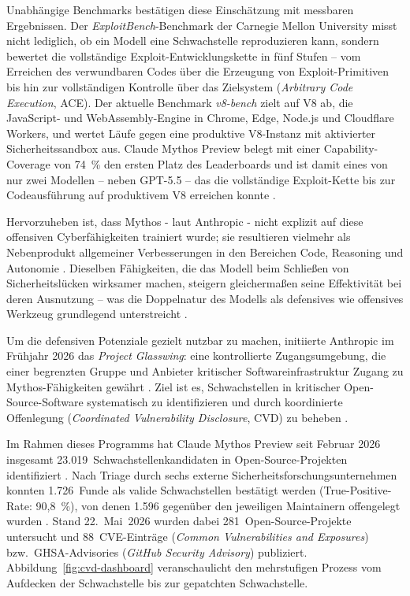 Unabhängige Benchmarks bestätigen diese Einschätzung mit messbaren
Ergebnissen. Der \emph{ExploitBench}-Benchmark der Carnegie Mellon
University misst nicht lediglich, ob ein Modell eine Schwachstelle
reproduzieren kann, sondern bewertet die vollständige
Exploit-Entwicklungskette in fünf Stufen -- vom Erreichen des
verwundbaren Codes über die Erzeugung von Exploit-Primitiven bis hin
zur vollständigen Kontrolle über das Zielsystem (\emph{Arbitrary Code Execution}, ACE). Der aktuelle Benchmark \emph{v8-bench} zielt auf
V8 ab, die JavaScript- und WebAssembly-Engine in Chrome, Edge,
Node.js und Cloudflare Workers, und wertet Läufe gegen eine
produktive V8-Instanz mit aktivierter Sicherheitssandbox aus.
Claude Mythos Preview belegt mit einer Capability-Coverage von
74~\% den ersten Platz des Leaderboards und ist damit eines von nur
zwei Modellen -- neben GPT-5.5 -- das die vollständige Exploit-Kette
bis zur Codeausführung auf produktivem V8 erreichen konnte \cite{exploitbench2026}.

Hervorzuheben ist, dass Mythos - laut Anthropic - nicht explizit auf diese offensiven
Cyberfähigkeiten trainiert wurde; sie resultieren vielmehr als Nebenprodukt allgemeiner Verbesserungen in den Bereichen Code, Reasoning
und Autonomie \cite{anthropic_mythos_preview}. Dieselben Fähigkeiten, die das
Modell beim Schließen von Sicherheitslücken wirksamer machen, steigern
gleichermaßen seine Effektivität bei deren Ausnutzung -- was die Doppelnatur des Modells als defensives wie offensives Werkzeug
grundlegend unterstreicht \cite{anthropic_glasswing}.

Um die defensiven Potenziale gezielt nutzbar zu machen, initiierte
Anthropic im Frühjahr 2026 das \emph{Project Glasswing}: eine kontrollierte
Zugangsumgebung, die einer begrenzten Gruppe und Anbieter kritischer Softwareinfrastruktur Zugang zu Mythos-Fähigkeiten
gewährt \cite{anthropic_glasswing}. Ziel ist es, Schwachstellen in
kritischer Open-Source-Software systematisch zu identifizieren und durch
koordinierte Offenlegung (\emph{Coordinated Vulnerability Disclosure},
CVD) zu beheben \cite{anthropic_cvd}.

Im Rahmen dieses Programms hat Claude Mythos Preview seit Februar 2026
insgesamt 23.019~Schwachstellenkandidaten in Open-Source-Projekten
identifiziert \cite{anthropic_cvd_dashboard}. Nach Triage durch sechs
externe Sicherheitsforschungsunternehmen konnten 1.726~Funde als valide
Schwachstellen bestätigt werden (True-Positive-Rate: 90,8~\%), von
denen 1.596 gegenüber den jeweiligen Maintainern offengelegt wurden
\cite{anthropic_cvd_dashboard}. Stand 22.~Mai~2026 wurden dabei
281~Open-Source-Projekte untersucht und 88~CVE-Einträge
(\emph{Common Vulnerabilities and Exposures}) bzw.\
GHSA-Advisories (\emph{GitHub Security Advisory}) publiziert.
Abbildung~\ref{fig:cvd-dashboard} veranschaulicht den mehrstufigen
Prozess vom Aufdecken der Schwachstelle bis zur gepatchten Schwachstelle.

